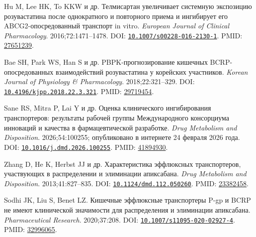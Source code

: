 \documentclass[11pt]{article}
\begin{document}
\begin{description}[before={\microtypesetup{expansion=false}\setlength{\RaggedRightRightskip}{0pt plus 4em}\RaggedRight}]
\item[{[74]}] Hu M, Lee HK, To KKW и др. Телмисартан увеличивает системную экспозицию розувастатина после однократного и повторного приема и ингибирует его ABCG2-опосредованный транспорт in vitro. \textit{\foreignlanguage{english}{European Journal of Clinical Pharmacology}}. 2016;72:1471--1478. DOI: \href{https://doi.org/10.1007/s00228-016-2130-1}{\nolinkurl{10.1007/s00228-016-2130-1}}. PMID: \href{https://pubmed.ncbi.nlm.nih.gov/27651239/}{27651239}.
\item[{[75]}] Bae SH, Park WS, Han S и др. PBPK-прогнозирование кишечных BCRP-опосредованных взаимодействий розувастатина у корейских участников. \textit{\foreignlanguage{english}{Korean Journal of Physiology \& Pharmacology}}. 2018;22:321--329. DOI: \href{https://doi.org/10.4196/kjpp.2018.22.3.321}{\nolinkurl{10.4196/kjpp.2018.22.3.321}}. PMID: \href{https://pubmed.ncbi.nlm.nih.gov/29719454/}{29719454}.
\item[{[76]}] Sane RS, Mitra P, Lai Y и др. Оценка клинического ингибирования транспортеров: результаты рабочей группы Международного консорциума инноваций и качества в фармацевтической разработке. \textit{\foreignlanguage{english}{Drug Metabolism and Disposition}}. 2026;54:100255; опубликовано в интернете 24 февраля 2026 года. DOI: \href{https://doi.org/10.1016/j.dmd.2026.100255}{\nolinkurl{10.1016/j.dmd.2026.100255}}. PMID: \href{https://pubmed.ncbi.nlm.nih.gov/41894930/}{41894930}.
\item[{[77]}] Zhang D, He K, Herbst JJ и др. Характеристика эффлюксных транспортеров, участвующих в распределении и элиминации апиксабана. \textit{\foreignlanguage{english}{Drug Metabolism and Disposition}}. 2013;41:827--835. DOI: \href{https://doi.org/10.1124/dmd.112.050260}{\nolinkurl{10.1124/dmd.112.050260}}. PMID: \href{https://pubmed.ncbi.nlm.nih.gov/23382458/}{23382458}.
\item[{[78]}] Sodhi JK, Liu S, Benet LZ. Кишечные эффлюксные транспортеры P-gp и BCRP не имеют клинической значимости для распределения и элиминации апиксабана. \textit{\foreignlanguage{english}{Pharmaceutical Research}}. 2020;37:208. DOI: \href{https://doi.org/10.1007/s11095-020-02927-4}{\nolinkurl{10.1007/s11095-020-02927-4}}. PMID: \href{https://pubmed.ncbi.nlm.nih.gov/32996065/}{32996065}.


\end{description}
\end{document}
